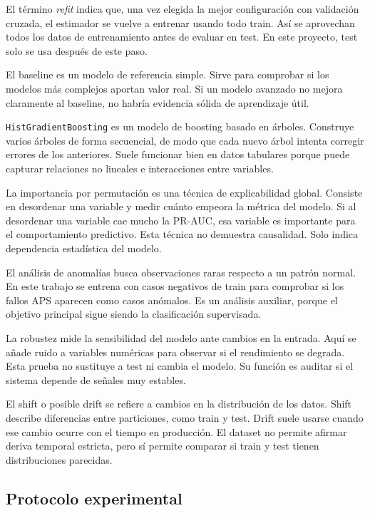\documentclass[11pt,a4paper]{article}
\begin{document}
El término \textit{refit} indica que, una vez elegida la mejor configuración con validación cruzada, el estimador se vuelve a entrenar usando todo train. Así se aprovechan todos los datos de entrenamiento antes de evaluar en test. En este proyecto, test solo se usa después de este paso.

El baseline es un modelo de referencia simple. Sirve para comprobar si los modelos más complejos aportan valor real. Si un modelo avanzado no mejora claramente al baseline, no habría evidencia sólida de aprendizaje útil.

\texttt{HistGradientBoosting} es un modelo de boosting basado en árboles. Construye varios árboles de forma secuencial, de modo que cada nuevo árbol intenta corregir errores de los anteriores. Suele funcionar bien en datos tabulares porque puede capturar relaciones no lineales e interacciones entre variables.

La importancia por permutación es una técnica de explicabilidad global. Consiste en desordenar una variable y medir cuánto empeora la métrica del modelo. Si al desordenar una variable cae mucho la PR-AUC, esa variable es importante para el comportamiento predictivo. Esta técnica no demuestra causalidad. Solo indica dependencia estadística del modelo.

El análisis de anomalías busca observaciones raras respecto a un patrón normal. En este trabajo se entrena con casos negativos de train para comprobar si los fallos APS aparecen como casos anómalos. Es un análisis auxiliar, porque el objetivo principal sigue siendo la clasificación supervisada.

La robustez mide la sensibilidad del modelo ante cambios en la entrada. Aquí se añade ruido a variables numéricas para observar si el rendimiento se degrada. Esta prueba no sustituye a test ni cambia el modelo. Su función es auditar si el sistema depende de señales muy estables.

El shift o posible drift se refiere a cambios en la distribución de los datos. Shift describe diferencias entre particiones, como train y test. Drift suele usarse cuando ese cambio ocurre con el tiempo en producción. El dataset no permite afirmar deriva temporal estricta, pero sí permite comparar si train y test tienen distribuciones parecidas.

\subsection{Protocolo experimental}
\end{document}
